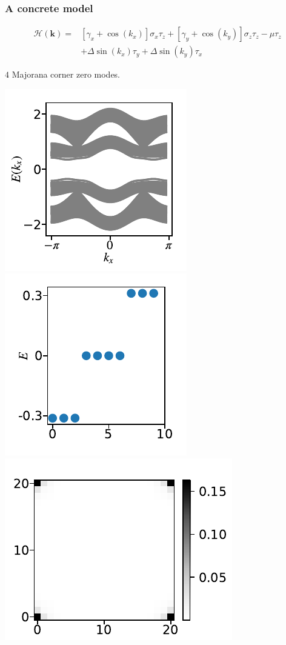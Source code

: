 \documentclass{beamer}
\newcommand{\mc}{\mathcal}
\renewcommand{\(}{\left(}
\renewcommand{\)}{\right)}
\renewcommand{\[}{\left[}
\renewcommand{\]}{\right]}
\begin{document}
\begin{frame}
    \frametitle{A concrete model}

    \begin{align*}
        \mc H(\bm k) = &\[\gamma_x + \cos(k_x)\] \sigma_x \tau_z + \[\gamma_y + \cos(k_y)\] \sigma_z \tau_z -\mu \tau_z  \nonumber \\
        & + \Delta \sin(k_x) \tau_y + \Delta \sin(k_y) \tau_x 
    \end{align*}
    \begin{center}
        $4$ Majorana corner zero modes. \citet*{Wang_Lin_Hughes_2018}

        \includegraphics[scale=0.7, trim = 5 0 10 0,clip, valign=c]{super_4_energy_cylinder.pdf}
        \includegraphics[scale=0.7, trim = 9 0 10 0,clip, valign=c]{super_4_open_boundary_zero_modes.pdf}
        \includegraphics[scale=0.62, trim = 0 0 0 15, clip, valign=c]{super_4_open_boundary_zero_modes_real_space.pdf}
    

\end{center}
\end{frame}
\end{document}
